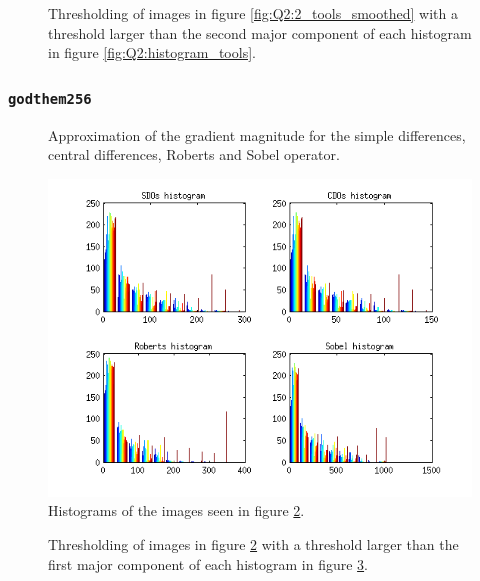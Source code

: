 \begin{figure}[H]
	\centering
	\scalebox{0.9}{}
	\caption{Thresholding of images in figure \ref{fig:Q2:2_tools_smoothed} with a threshold larger than the second major component of 
	each histogram in figure \ref{fig:Q2:histogram_tools}.}
	\label{fig:Q2:threshold_tools_smoothed_2}
\end{figure}




\subsubsection{\texttt{godthem256}}

\begin{figure}[H]
	\centering
	\scalebox{0.7}{}
	\caption{Approximation of the gradient magnitude for the simple differences, central differences, Roberts and Sobel operator.}
	\label{fig:Q2:2_house}
\end{figure}

\begin{figure}[H]
	\centering
	\includegraphics[scale=0.8]{./images/Q2/house/histogram_2.png}
	\caption{Histograms of the images seen in figure \ref{fig:Q2:2_house}.}
	\label{fig:Q2:histogram_house}
\end{figure}


\begin{figure}[H]
	\centering
	\scalebox{0.9}{}
	\caption{Thresholding of images in figure \ref{fig:Q2:2_house} with a threshold larger than the first major component of 
	each histogram in figure \ref{fig:Q2:histogram_house}.}
	\label{fig:Q2:threshold_house_1}
\end{figure}

